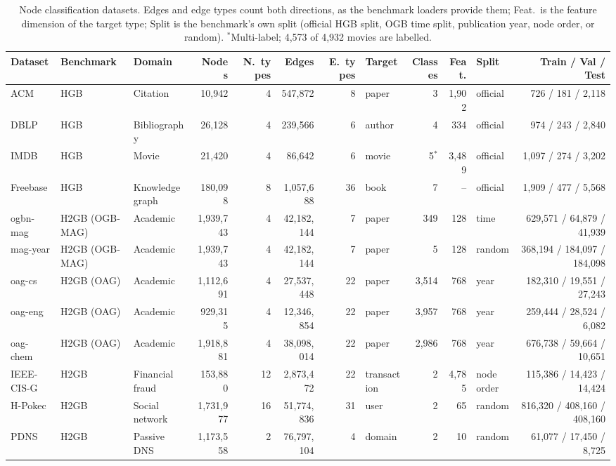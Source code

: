 \documentclass{article}
\begin{document}
\begin{table}[!htbp]
  \centering
  \caption{Node classification datasets. Edges and edge types count both directions, as the benchmark loaders provide them; Feat.\ is the feature dimension of the target type; Split is the benchmark's own split (official HGB split, OGB time split, publication year, node order, or random). $^\ast$Multi-label; 4{,}573 of 4{,}932 movies are labelled.}
  \label{tab:app-nc}
  \scriptsize
  \setlength{\tabcolsep}{2.4pt}
  \begin{tabular}{lllrrrrlrrlr}
    \toprule
    Dataset & Benchmark & Domain & Nodes & N.\ types & Edges & E.\ types & Target & Classes & Feat. & Split & Train / Val / Test \\
    \midrule
    ACM & HGB & Citation & 10{,}942 & 4 & 547{,}872 & 8 & paper & 3 & 1{,}902 & official & 726 / 181 / 2{,}118 \\
    DBLP & HGB & Bibliography & 26{,}128 & 4 & 239{,}566 & 6 & author & 4 & 334 & official & 974 / 243 / 2{,}840 \\
    IMDB & HGB & Movie & 21{,}420 & 4 & 86{,}642 & 6 & movie & 5$^\ast$ & 3{,}489 & official & 1{,}097 / 274 / 3{,}202 \\
    Freebase & HGB & Knowledge graph & 180{,}098 & 8 & 1{,}057{,}688 & 36 & book & 7 & -- & official & 1{,}909 / 477 / 5{,}568 \\
    \midrule
    ogbn-mag & H2GB (OGB-MAG) & Academic & 1{,}939{,}743 & 4 & 42{,}182{,}144 & 7 & paper & 349 & 128 & time & 629{,}571 / 64{,}879 / 41{,}939 \\
    mag-year & H2GB (OGB-MAG) & Academic & 1{,}939{,}743 & 4 & 42{,}182{,}144 & 7 & paper & 5 & 128 & random & 368{,}194 / 184{,}097 / 184{,}098 \\
    oag-cs & H2GB (OAG) & Academic & 1{,}112{,}691 & 4 & 27{,}537{,}448 & 22 & paper & 3{,}514 & 768 & year & 182{,}310 / 19{,}551 / 27{,}243 \\
    oag-eng & H2GB (OAG) & Academic & 929{,}315 & 4 & 12{,}346{,}854 & 22 & paper & 3{,}957 & 768 & year & 259{,}444 / 28{,}524 / 6{,}082 \\
    oag-chem & H2GB (OAG) & Academic & 1{,}918{,}881 & 4 & 38{,}098{,}014 & 22 & paper & 2{,}986 & 768 & year & 676{,}738 / 59{,}664 / 10{,}651 \\
    IEEE-CIS-G & H2GB & Financial fraud & 153{,}880 & 12 & 2{,}873{,}472 & 22 & transaction & 2 & 4{,}785 & node order & 115{,}386 / 14{,}423 / 14{,}424 \\
    H-Pokec & H2GB & Social network & 1{,}731{,}977 & 16 & 51{,}774{,}836 & 31 & user & 2 & 65 & random & 816{,}320 / 408{,}160 / 408{,}160 \\
    PDNS & H2GB & Passive DNS & 1{,}173{,}558 & 2 & 76{,}797{,}104 & 4 & domain & 2 & 10 & random & 61{,}077 / 17{,}450 / 8{,}725 \\
    \bottomrule
  \end{tabular}
\end{table}
\end{document}
